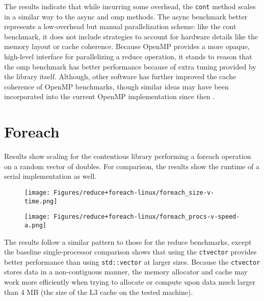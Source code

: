 The results indicate that while incurring some overhead, the \texttt{cont}
method scales in a similar way to the async and omp methods. The async benchmark
better represents a low-overhead but manual parallelization scheme: like the
cont benchmark, it does not include strategies to account for hardware details
like the memory layout or cache coherence. Because OpenMP provides a more
opaque, high-level interface for parallelizing a reduce operation, it stands to
reason that the omp benchmark has better performance because of extra tuning
provided by the library itself. Although, other software has further improved
the cache coherence of OpenMP benchmarks, though similar ideas may have been
incorporated into the current OpenMP implementation since then
\cite{cachecoherence}.

\section{Foreach}
Results show scaling for the contentious library performing a foreach operation
on a random vector of doubles. For comparison, the results show the runtime of a
serial implementation as well.

\begin{figure}[!h]
\centering
    \texttt{[image: Figures/reduce+foreach-linux/foreach\_size-v-time.png]}
\end{figure}
\begin{figure}[!h]
\centering
    \texttt{[image: Figures/reduce+foreach-linux/foreach\_procs-v-speed-a.png]}
\end{figure}

The results follow a similar pattern to those for the reduce benchmarks, except
the baseline single-processor comparison shows that using the \texttt{ctvector}
provides better performance than using \texttt{std::vector} at larger sizes. Because the
\texttt{ctvector} stores data in a non-contiguous manner, the memory allocator
and cache may work more efficiently when trying to allocate or compute upon data
much larger than 4 MB (the size of the L3 cache on the tested machine).

\begin{comment}
Another test demonstrates the effect on the branching factor of the
bit-partitioned vector used to implement the \texttt{ctvector}. The results show
that a minimum branching factor of $2^{10}$ or 1024 provides approximately the
best performance for the foreach benchmark; choosing the minimum branching
factor allows for minimal copying when performing partial operations on the
vector and otherwise reduces contention between threads. Results did not vary
much depending on the particular benchmark or number of threads used. Other uses
of this data structure, such as by D'orange, indicated that a much lower
branching factor would provide near-optimal performance, such as $2^5$ or $2^6$.
But, the use cases tested often involved random, out-of-order mutations,
insertions, or deletions; our use cases involve almost entirely patterned
mutations that can take better advantage of large, contiguous blocks of values.
\end{comment}

